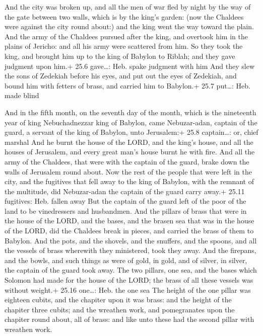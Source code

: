  And the city was broken up, and all the men of war fled
by night by the way of the gate between two walls, which is by the
king's garden: (now the Chaldees were against the city round about:) and
the king went the way toward the plain.  And the army of the
Chaldees pursued after the king, and overtook him in the plains of
Jericho: and all his army were scattered from him.  So they
took the king, and brought him up to the king of Babylon to Riblah; and
they gave judgment upon him.+ 25.6 gave\ldots: Heb. spake judgment with
him  And they slew the sons of Zedekiah before his eyes, and
put out the eyes of Zedekiah, and bound him with fetters of brass, and
carried him to Babylon.+ 25.7 put\ldots: Heb. made blind

 And in the fifth month, on the seventh day of the month,
which is the nineteenth year of king Nebuchadnezzar king of Babylon,
came Nebuzar-adan, captain of the guard, a servant of the king of
Babylon, unto Jerusalem:+ 25.8 captain\ldots: or, chief marshal
 And he burnt the house of the LORD, and the king's house,
and all the houses of Jerusalem, and every great man's house burnt he
with fire.  And all the army of the Chaldees, that were
with the captain of the guard, brake down the walls of Jerusalem round
about.  Now the rest of the people that were left in the
city, and the fugitives that fell away to the king of Babylon, with the
remnant of the multitude, did Nebuzar-adan the captain of the guard
carry away.+ 25.11 fugitives: Heb. fallen away  But the
captain of the guard left of the poor of the land to be vinedressers and
husbandmen.  And the pillars of brass that were in the
house of the LORD, and the bases, and the brasen sea that was in the
house of the LORD, did the Chaldees break in pieces, and carried the
brass of them to Babylon.  And the pots, and the shovels,
and the snuffers, and the spoons, and all the vessels of brass wherewith
they ministered, took they away.  And the firepans, and the
bowls, and such things as were of gold, in gold, and of silver, in
silver, the captain of the guard took away.  The two
pillars, one sea, and the bases which Solomon had made for the house of
the LORD; the brass of all these vessels was without weight.+ 25.16
one\ldots: Heb. the one sea  The height of the one pillar
was eighteen cubits, and the chapiter upon it was brass: and the height
of the chapiter three cubits; and the wreathen work, and pomegranates
upon the chapiter round about, all of brass: and like unto these had the
second pillar with wreathen work.

